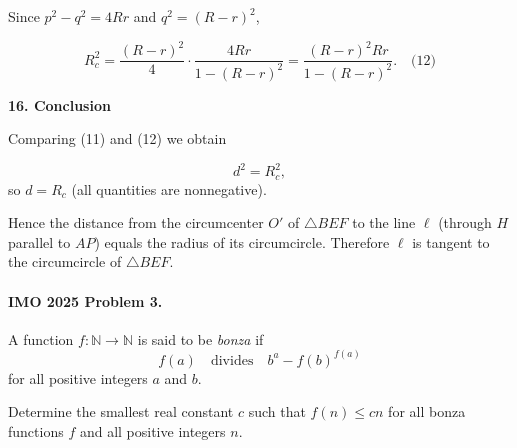 \documentclass{llmxive}
\providecommand{\NN}{\mathbb N}
\providecommand{\solutionheading}[1]{\par\smallskip\noindent\textbf{#1}\par}
\begin{document}
Since \(p^2 - q^2 = 4R r\) and \(q^2 = (R - r)^2\),\par
\[
R_c^2 = \frac{ (R - r)^2}{4} \cdot \frac{4R r}{1 - (R - r)^2}
= \frac{ (R - r)^2 R r}{1 - (R - r)^2}. \quad\text{(12)}
\]
\solutionheading{16. Conclusion}
Comparing (11) and (12) we obtain\par
\[
d^2 = R_c^2,
\]
so \(d = R_c\) (all quantities are nonnegative).\par
Hence the distance from the circumcenter \(O'\) of \(\triangle BEF\) to the line \(\ell\) (through \(H\) parallel to \(AP\)) equals the radius of its circumcircle. Therefore \(\ell\) is tangent to the circumcircle of \(\triangle BEF\).\par
\par


\paragraph{IMO 2025 Problem 3.}
\begin{mdframed}[style=mdpurplebox,frametitle={IMO 2025 Problem 3}]
A function $f \colon \NN \to \NN$ is said to be \emph{bonza} if
\[ f(a)\quad\text{divides}\quad b^a-f(b)^{f(a)} \]
for all positive integers $a$ and $b$.

Determine the smallest real constant $c$ such that $f(n) \leq cn$
for all bonza functions $f$ and all positive integers $n$.
\end{mdframed}
\end{document}
